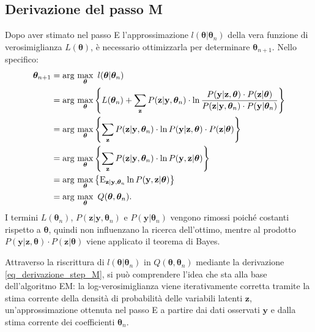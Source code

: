 \subsection{Derivazione del passo M}
Dopo aver stimato nel passo E l'approssimazione $l(\boldsymbol{\theta}|\boldsymbol{\theta}_n)$  della vera funzione di verosimiglianza $L(\boldsymbol{\theta})$, è necessario ottimizzarla per determinare $\boldsymbol{\theta}_{n+1}$. Nello specifico:
\begin{equation}
	\begin{split}
		\boldsymbol{\theta}_{n+1} & = \text{arg}\,\max\limits_{\boldsymbol{\theta}}\  l(\boldsymbol{\theta}|\boldsymbol{\theta}_n) \\
		& =  \text{arg}\,\max\limits_{\boldsymbol{\theta}}\left\{ \textcolor{black}{L(\boldsymbol{\theta}_n)} + \sum_{\mathbf{z}}^{} P(\mathbf{z}|\mathbf{y},\boldsymbol{\theta}_n)\cdot\ln\frac{P(\mathbf{y}|\mathbf{z},\boldsymbol{\theta})\cdot P(\mathbf{z}|\boldsymbol{\theta})}{\textcolor{black}{P(\mathbf{z}|\mathbf{y},\boldsymbol{\theta}_n)}\cdot\textcolor{black}{P(\mathbf{y}|\boldsymbol{\theta}_n)}}\right\} \\
		& = \text{arg}\,\max\limits_{\boldsymbol{\theta}}\left\{\sum_{\mathbf{z}}^{} P(\mathbf{z}|\mathbf{y},\boldsymbol{\theta}_n)\cdot\ln\textcolor{black}{ P(\mathbf{y}|\mathbf{z},\boldsymbol{\theta})\cdot P(\mathbf{z}|\boldsymbol{\theta})}\right\}\\
		& = \text{arg}\,\max\limits_{\boldsymbol{\theta}}\left\{\sum_{\mathbf{z}}^{}P(\mathbf{z}|\mathbf{y},\boldsymbol{\theta}_n)\cdot\ln \textcolor{black}{P(\mathbf{y},\mathbf{z}|\boldsymbol{\theta})}\right\}\\
		& = \text{arg}\,\max\limits_{\boldsymbol{\theta}}\left\{\text{E}_{\mathbf{z}|\mathbf{y},\boldsymbol{\theta}_n}\ln P(\mathbf{y},\mathbf{z}|\boldsymbol{\theta})\right\}\\
		& = \text{arg}\,\max\limits_{\boldsymbol{\theta}}\ Q(\boldsymbol{\theta},\boldsymbol{\theta}_n).
	\end{split}
	\label{eq_derivazione_step_M}
\end{equation}
I termini $L(\boldsymbol{\theta}_n)$, $P(\mathbf{z}|\mathbf{y},\boldsymbol{\theta}_n)$ e $P(\mathbf{y}|\boldsymbol{\theta}_n)$ vengono rimossi poiché costanti rispetto a $\boldsymbol{\theta}$, quindi non influenzano la ricerca dell'ottimo, mentre al prodotto $P(\mathbf{y}|\mathbf{z},\boldsymbol{\theta})\cdot P(\mathbf{z}|\boldsymbol{\theta})$ viene applicato il teorema di Bayes. \par Attraverso la riscrittura di $l(\boldsymbol{\theta}|\boldsymbol{\theta}_n)$ in $Q(\boldsymbol{\theta},\boldsymbol{\theta}_n)$ mediante la derivazione \ref{eq_derivazione_step_M}, si può comprendere l'idea che sta alla base dell'algoritmo EM: la log-verosimiglianza viene iterativamente corretta tramite la stima corrente della densità di probabilità delle variabili latenti $\mathbf{z}$, un'approssimazione ottenuta nel passo E a partire dai dati osservati $\mathbf{y}$ e dalla stima corrente dei coefficienti $\boldsymbol{\theta}_n$.
